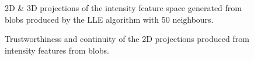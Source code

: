 \begin{figure}[H]
	\centering
	\caption{2D \& 3D projections of the intensity feature space generated from blobs produced by the LLE algorithm with 50 neighbours.}\label{fig:intensity_LLE_mapping}
\end{figure}
\clearpage

\clearpage
\begin{figure}[H]
	\centering
	\caption{Trustworthiness and continuity of the 2D projections produced from intensity features from blobs.}\label{fig:TC_2d_intensity}
\end{figure}

